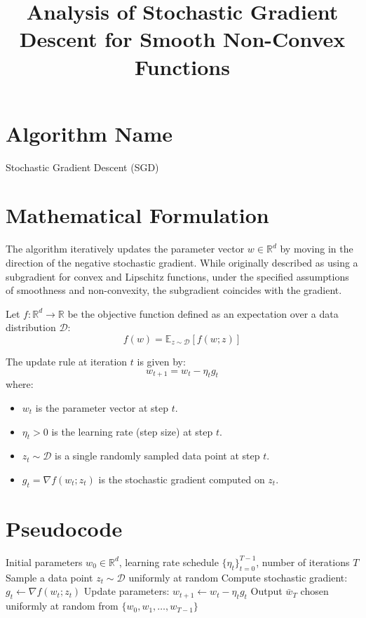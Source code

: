 \documentclass[11pt]{article}
\title{Analysis of Stochastic Gradient Descent for Smooth Non-Convex Functions}
\author{}
\date{}
\begin{document}
\maketitle

\section*{Algorithm Name}
Stochastic Gradient Descent (SGD)

\section*{Mathematical Formulation}
The algorithm iteratively updates the parameter vector $w \in \mathbb{R}^d$ by moving in the direction of the negative stochastic gradient. While originally described as using a subgradient for convex and Lipschitz functions, under the specified assumptions of smoothness and non-convexity, the subgradient coincides with the gradient.

Let $f: \mathbb{R}^d \rightarrow \mathbb{R}$ be the objective function defined as an expectation over a data distribution $\mathcal{D}$:
$$f(w) = \mathbb{E}_{z \sim \mathcal{D}}[f(w; z)]$$

The update rule at iteration $t$ is given by:
$$w_{t+1} = w_t - \eta_t g_t$$
where:
\begin{itemize}
    \item $w_t$ is the parameter vector at step $t$.
    \item $\eta_t > 0$ is the learning rate (step size) at step $t$.
    \item $z_t \sim \mathcal{D}$ is a single randomly sampled data point at step $t$.
    \item $g_t = \nabla f(w_t; z_t)$ is the stochastic gradient computed on $z_t$.
\end{itemize}

\section*{Pseudocode}
\begin{algorithm}[H]
\caption{Stochastic Gradient Descent (SGD)}
\begin{algorithmic}[1]
\REQUIRE Initial parameters $w_0 \in \mathbb{R}^d$, learning rate schedule $\{\eta_t\}_{t=0}^{T-1}$, number of iterations $T$
    \STATE Sample a data point $z_t \sim \mathcal{D}$ uniformly at random
    \STATE Compute stochastic gradient: $g_t \leftarrow \nabla f(w_t; z_t)$
    \STATE Update parameters: $w_{t+1} \leftarrow w_t - \eta_t g_t$
\ENDFOR
\RETURN Output $\bar{w}_T$ chosen uniformly at random from $\{w_0, w_1, \dots, w_{T-1}\}$
\end{algorithmic}
\end{algorithm}
\end{document}
